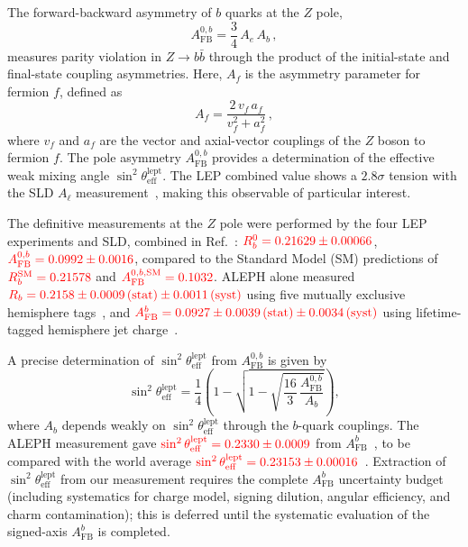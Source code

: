 \documentclass[11pt,a4paper]{article}
\newcommand{\external}[1]{\textcolor{red}{#1}}
\begin{document}
The forward-backward asymmetry of $b$ quarks at the $Z$ pole,
\begin{equation}
A_\text{FB}^{0,b} = \frac{3}{4}\, A_e \, A_b\,,
\label{eq:AFBb_def}
\end{equation}
measures parity violation in $Z \to b\bar{b}$ through the product
of the initial-state and final-state coupling asymmetries.
Here, $A_f$ is the asymmetry parameter for fermion $f$, defined as
\begin{equation}
A_f = \frac{2\, v_f\, a_f}{v_f^2 + a_f^2}\,,
\label{eq:Af_def}
\end{equation}
where $v_f$ and $a_f$ are the vector and axial-vector couplings of
the $Z$ boson to fermion $f$.
The pole asymmetry $A_\text{FB}^{0,b}$ provides a determination of
the effective weak mixing angle $\sin^2\theta_\text{eff}^\text{lept}$.
The LEP combined value shows a $2.8\sigma$ tension with the SLD
$A_\ell$ measurement~\cite{LEP:EWWG:2005}, making this observable
of particular interest.

The definitive measurements at the $Z$ pole were performed by the
four LEP experiments and SLD, combined in
Ref.~\cite{LEP:EWWG:2005}:
$\external{R_b^0 = 0.21629 \pm 0.00066}$,
$\external{A_\text{FB}^{0,b} = 0.0992 \pm 0.0016}$,
compared to the Standard Model (SM) predictions of
$\external{R_b^\text{SM} = 0.21578}$ and
$\external{A_\text{FB}^{0,b,\text{SM}} = 0.1032}$.
ALEPH alone measured
$\external{R_b = 0.2158 \pm 0.0009\,\text{(stat)} \pm 0.0011\,\text{(syst)}}$
using five mutually exclusive hemisphere tags~\cite{ALEPH:Rb:1996},
and
$\external{A_\text{FB}^b = 0.0927 \pm 0.0039\,\text{(stat)} \pm 0.0034\,\text{(syst)}}$
using lifetime-tagged hemisphere jet charge~\cite{ALEPH:AFBb}.

A precise determination of $\sin^2\theta_\text{eff}^\text{lept}$ from
$A_\text{FB}^{0,b}$ is given by
\begin{equation}
\sin^2\theta_\text{eff}^\text{lept} = \frac{1}{4}\left(1 -
\sqrt{1 - \sqrt{\frac{16}{3}\,\frac{A_\text{FB}^{0,b}}{A_b}}}\right),
\label{eq:sin2theta}
\end{equation}
where $A_b$ depends weakly on $\sin^2\theta_\text{eff}^\text{lept}$
through the $b$-quark couplings.
The ALEPH measurement gave
$\external{\sin^2\theta_\text{eff}^\text{lept} = 0.2330 \pm 0.0009}$
from $A_\text{FB}^b$~\cite{ALEPH:AFBb}, to be compared with the
world average
$\external{\sin^2\theta_\text{eff}^\text{lept} = 0.23153 \pm 0.00016}$~\cite{LEP:EWWG:2005}.
Extraction of $\sin^2\theta_\text{eff}^\text{lept}$ from our measurement
requires the complete $A_\text{FB}^b$ uncertainty budget (including
systematics for charge model, signing dilution, angular efficiency,
and charm contamination); this is deferred until the systematic
evaluation of the signed-axis $A_\text{FB}^b$ is completed.
\end{document}

